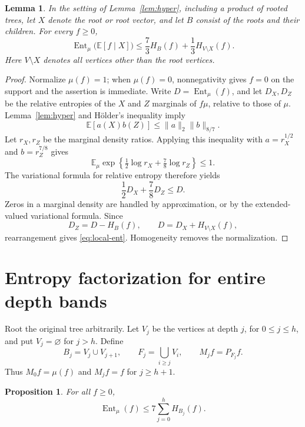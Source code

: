 \documentclass[11pt]{article}
\newtheorem{lemma}[theorem]{Lemma}
\newtheorem{proposition}[theorem]{Proposition}
\newcommand{\E}{\mathbb E}
\newcommand{\Ent}{\operatorname{Ent}}
\begin{document}
\begin{lemma}\label{lem:local-ent}
In the setting of Lemma~\ref{lem:hyper}, including a product of rooted trees, let $X$ denote the root or root vector, and let $B$ consist of the roots and their children. For every $f\ge0$,
\begin{equation}\label{eq:local-ent}
\Ent_\mu\big(\E[f\mid X]\big)
\le\frac73 H_B(f)+\frac13 H_{V\setminus X}(f).
\end{equation}
Here $V\setminus X$ denotes all vertices other than the root vertices.
\end{lemma}

\begin{proof}
Normalize $\mu(f)=1$; when $\mu(f)=0$, nonnegativity gives $f=0$ on the support and the assertion is immediate. Write $D=\Ent_\mu(f)$, and let $D_X,D_Z$ be the relative entropies of the $X$ and $Z$ marginals of $f\mu$, relative to those of $\mu$. Lemma~\ref{lem:hyper} and H\"older's inequality imply
\[
\E[a(X)b(Z)]\le\|a\|_2\|b\|_{8/7}.
\]
Let $r_X,r_Z$ be the marginal density ratios. Applying this inequality with $a=r_X^{1/2}$ and $b=r_Z^{7/8}$ gives
\[
\E_\mu\exp\!\left\{\tfrac12\log r_X+\tfrac78\log r_Z\right\}\le1.
\]
The variational formula for relative entropy therefore yields
\[
\frac12D_X+\frac78D_Z\le D.
\]
Zeros in a marginal density are handled by approximation, or by the extended-valued variational formula. Since
\[
D_Z=D-H_B(f),\qquad D=D_X+H_{V\setminus X}(f),
\]
rearrangement gives \eqref{eq:local-ent}. Homogeneity removes the normalization.
\end{proof}

\section{Entropy factorization for entire depth bands}

Root the original tree arbitrarily. Let $V_j$ be the vertices at depth $j$, for $0\le j\le h$, and put $V_j=\varnothing$ for $j>h$. Define
\[
B_j=V_j\cup V_{j+1},\qquad
F_j=\bigcup_{i\ge j}V_i,\qquad
M_jf=P_{F_j}f.
\]
Thus $M_0f=\mu(f)$ and $M_jf=f$ for $j\ge h+1$.

\begin{proposition}\label{prop:bands}
For all $f\ge0$,
\begin{equation}\label{eq:band-at}
\Ent_\mu(f)\le7\sum_{j=0}^h H_{B_j}(f).
\end{equation}
\end{proposition}
\end{document}
